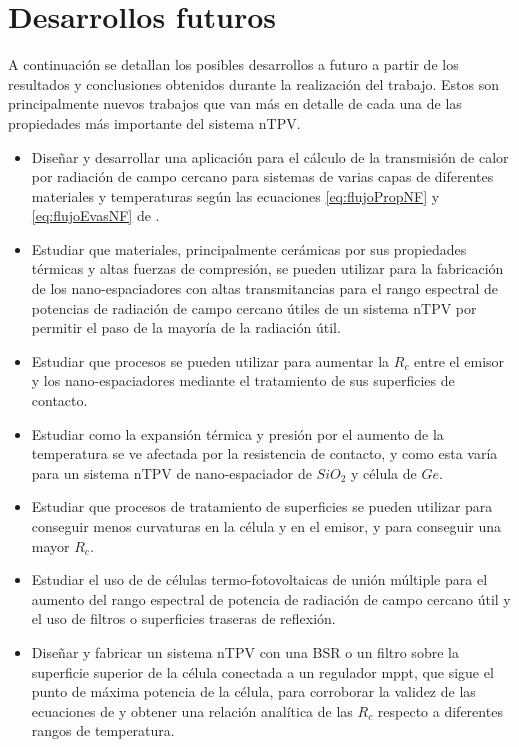 \section{Desarrollos futuros}
A continuación se detallan los posibles desarrollos a futuro a partir de los resultados y conclusiones obtenidos durante la realización del trabajo. Estos son principalmente nuevos trabajos que van más en detalle de cada una de las propiedades más importante del sistema nTPV.
\begin{itemize}
	\item Diseñar y desarrollar una aplicación para el cálculo de la transmisión de calor por radiación de campo cercano para sistemas de varias capas de diferentes materiales y temperaturas según las ecuaciones \eqref{eq:flujoPropNF} y \eqref{eq:flujoEvasNF} de \cite{nfTPV_fullEquations}.
	\item Estudiar que materiales, principalmente cerámicas por sus propiedades térmicas y altas fuerzas de compresión, se pueden utilizar para la fabricación de los nano-espaciadores con altas transmitancias para el rango espectral de potencias de radiación de campo cercano útiles de un sistema nTPV por permitir el paso de la mayoría de la radiación útil.
	\item Estudiar que procesos se pueden utilizar para aumentar la $R_c$ entre el emisor y los nano-espaciadores mediante el tratamiento de sus superficies de contacto.
	\item Estudiar como la expansión térmica y presión por el aumento de la temperatura se ve afectada por la resistencia de contacto, y como esta varía para un sistema nTPV de nano-espaciador de $SiO_2$ y célula de $Ge$.	
	\item Estudiar que procesos de tratamiento de superficies se pueden utilizar para conseguir menos curvaturas en la célula y en el emisor, y para conseguir una mayor $R_c$.
	\item Estudiar el uso de de células termo-fotovoltaicas de unión múltiple para el aumento del rango espectral de potencia de radiación de campo cercano útil y el uso de filtros o superficies traseras de reflexión.
	\item Diseñar y fabricar un sistema nTPV con una BSR o un filtro sobre la superficie superior de la célula conectada a un regulador mppt, que sigue el punto de máxima potencia de la célula, para corroborar la validez de las ecuaciones de \cite{nfTPV_fullEquations} y obtener una relación analítica de las $R_c$ respecto a diferentes rangos de temperatura.
\end{itemize}